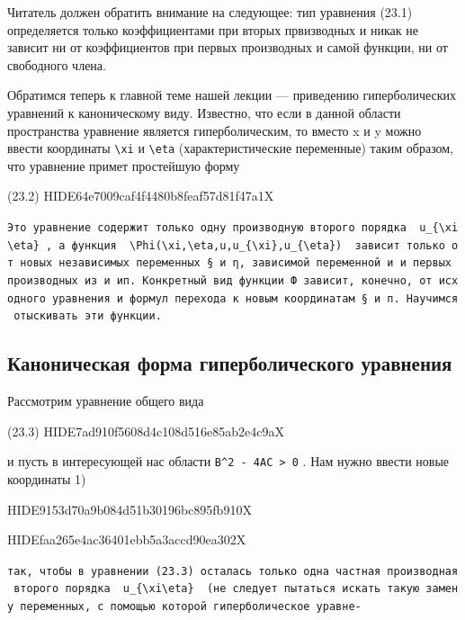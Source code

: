 \documentclass[
  ukrainian,
]{article}
\begin{document}
Читатель должен обратить внимание на следующее: тип уравнения (23.1)
определяется только коэффициентами при вторых првизводных и никак не
зависит ни от коэффициентов при первых производных и самой функции, ни
от свободного члена.

Обратимся теперь к главной теме нашей лекции --- приведению
гиперболических уравнений к каноническому виду. Известно, что если в
данной области пространства уравнение является гиперболическим, то
вместо x и y можно ввести координаты \texttt{\textbackslash{}xi} и
\texttt{\textbackslash{}eta} (характеристические переменные) таким
образом, что уравнение примет простейшую форму

(23.2) HIDE64e7009caf4f4480b8feaf57d81f47a1X

\texttt{Это\ уравнение\ содержит\ только\ одну\ производную\ второго\ порядка\ \ \textquotesingle{}u\_\{\textbackslash{}xi\textbackslash{}eta\}\textquotesingle{}\ ,\ а\ функция\ \ \textquotesingle{}\textbackslash{}Phi(\textbackslash{}xi,\textbackslash{}eta,u,u\_\{\textbackslash{}xi\},u\_\{\textbackslash{}eta\})\textquotesingle{}\ \ зависит\ только\ от\ новых\ независимых\ переменных\ §\ и\ η,\ зависимой\ переменной\ и\ и\ первых\ производных\ из\ и\ ип.\ Конкретный\ вид\ функции\ Ф\ зависит,\ конечно,\ от\ исходного\ уравнения\ и\ формул\ перехода\ к\ новым\ координатам\ §\ и\ п.\ Научимся\ отыскивать\ эти\ функции.}

\subsection{Каноническая форма гиперболического
уравнения}\label{ux43aux430ux43dux43eux43dux438ux447ux435ux441ux43aux430ux44f-ux444ux43eux440ux43cux430-ux433ux438ux43fux435ux440ux431ux43eux43bux438ux447ux435ux441ux43aux43eux433ux43e-ux443ux440ux430ux432ux43dux435ux43dux438ux44f}

Рассмотрим уравнение общего вида

(23.3) HIDE7ad910f5608d4c108d516e85ab2e4c9aX

и пусть в интересующей нас области
\texttt{B\^{}2\ -\ 4AC\ \textgreater{}\ 0} . Нам нужно ввести новые
координаты 1)

HIDE9153d70a9b084d51b30196bc895fb910X

HIDEfaa265e4ac36401ebb5a3accd90ea302X

\texttt{так,\ чтобы\ в\ уравнении\ (23.3)\ осталась\ только\ одна\ частная\ производная\ второго\ порядка\ \ \textquotesingle{}u\_\{\textbackslash{}xi\textbackslash{}eta\}\textquotesingle{}\ \ (не\ следует\ пытаться\ искать\ такую\ замену\ переменных,\ с\ помощью\ которой\ гиперболическое\ уравне-}
\end{document}
